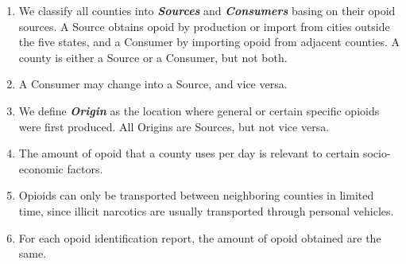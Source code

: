 \begin{enumerate}[$\mathcal{A}$1.]
	\item We classify all counties into \textbf{\itshape Sources} and \textbf{\itshape Consumers} basing on their opoid sources. A Source obtains opoid by production or import from cities outside the five states, and a Consumer by importing opoid from adjacent counties. A county is either a Source or a Consumer, but not both.
	
	\item A Consumer may change into a Source, and vice versa.
	
	\item We define \textbf{\itshape Origin} as the location where general or certain specific opioids were first produced. All Origins are Sources, but not vice versa.
	
	\item The amount of opoid that a county uses per day is relevant to certain socio-economic factors.
	
	\item Opioids can only be transported between neighboring counties in limited time, since illicit narcotics are usually transported through personal vehicles.\cite{9}
	
	\item For each opoid identification report, the amount of opoid obtained are the same. 
\end{enumerate}